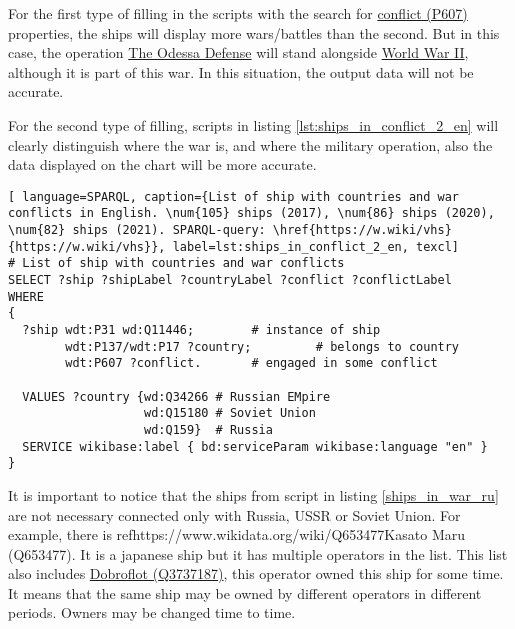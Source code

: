 For the first type of filling in the scripts with the search for \href{https://www.wikidata.org/wiki/Property:P607}{conflict (P607)} properties, the ships will display more wars/battles than the second. But in this case, the operation \href{https://en.wikipedia.org/wiki/Siege_of_Odessa_(1941)}{The Odessa Defense} will stand alongside \href{https://en.wikipedia.org/wiki/World_War_II}{World War II}, although it is part of this war. In this situation, the output data will not be accurate.

\label{question:ship_3}

For the second type of filling, scripts in listing \ref{lst:ships_in_conflict_2_en} will clearly distinguish where the war is, and where the military operation, also the data displayed on the chart will be more accurate.

\begin{lstlisting}[ language=SPARQL, caption={List of ship with countries and war conflicts in English. \num{105} ships (2017), \num{86} ships (2020), \num{82} ships (2021). SPARQL-query: \href{https://w.wiki/vhs}{https://w.wiki/vhs}}, label=lst:ships_in_conflict_2_en, texcl]
# List of ship with countries and war conflicts
SELECT ?ship ?shipLabel ?countryLabel ?conflict ?conflictLabel
WHERE
{
  ?ship wdt:P31 wd:Q11446;        # instance of ship
        wdt:P137/wdt:P17 ?country;         # belongs to country
        wdt:P607 ?conflict.       # engaged in some conflict
  
  VALUES ?country {wd:Q34266 # Russian EMpire
                   wd:Q15180 # Soviet Union
                   wd:Q159}  # Russia
  SERVICE wikibase:label { bd:serviceParam wikibase:language "en" }
}
\end{lstlisting}

It is important to notice that the ships from script in listing \ref{ships_in_war_ru} are not necessary connected only with Russia, USSR or Soviet Union.
For example, there is ref{https://www.wikidata.org/wiki/Q653477}{Kasato Maru (Q653477)}. It is a japanese ship but it has multiple operators in the list. This list also includes \href{https://www.wikidata.org/wiki/Q3737187}{Dobroflot (Q3737187)}, this operator owned this ship for some time. It means that the same ship may be owned by different operators in different periods. Owners may be changed time to time.

